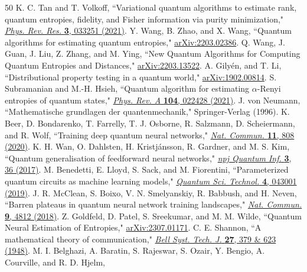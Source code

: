 \documentclass[aps,groupedaddress,superscriptaddress,amssymb,amsmath,amsbsy,amsfonts,twocolumn,pra]{revtex4}
\begin{document}
\begin{thebibliography}{50}
K. C. Tan and T. Volkoff,
``Variational quantum algorithms to estimate rank, quantum entropies, fidelity, and Fisher information via purity minimization,"
\href{http://dx.doi.org/10.1103/PhysRevResearch.3.033251}{
{\it Phys. Rev. Res.} \textbf{3}, 033251 (2021)}.
%
Y. Wang, B. Zhao, and X. Wang,
``Quantum algorithms for estimating quantum entropies,"
\href{https://doi.org/10.48550/arXiv.2203.02386}{
arXiv:2203.02386}.
%
Q. Wang, J. Guan, J. Liu, Z. Zhang, and M. Ying,
``New Quantum Algorithms for Computing Quantum Entropies and Distances,"
\href{https://doi.org/10.48550/arXiv.2203.13522}{
arXiv:2203.13522}.
%
A. Gily\'{e}n, and T. Li,
``Distributional property testing in a quantum world,"
\href{https://doi.org/10.48550/arXiv.1902.00814}{
arXiv:1902.00814}.
%
S. Subramanian and M.-H. Hsieh,
``Quantum algorithm for estimating $\alpha$-Renyi entropies of quantum states,"
\href{http://dx.doi.org/10.1103/PhysRevA.104.022428}{
{\it Phys. Rev. A} \textbf{104}, 022428 (2021)}. 
%
J. von Neumann,
``Mathematische grundlagen der quantenmechanik,"
Springer-Verlag (1996).
%
K. Beer, D. Bondarenko, T. Farrelly, T. J. Osborne, R. Salzmann, D. Scheiermann, and R. Wolf,
``Training deep quantum neural networks," 
\href{http://dx.doi.org/10.1038/s41467-020-14454-2}{
{\it Nat. Commun.} \textbf{11}, 808 (2020)}.
%
K. H. Wan, O. Dahlsten, H. Kristj\'{a}nsson, R. Gardner, and M. S. Kim,
``Quantum generalisation of feedforward neural networks," 
\href{http://dx.doi.org/10.1038/s41534-017-0032-4}{
{\it npj Quantum Inf.} \textbf{3}, 36 (2017)}.
%
M. Benedetti, E. Lloyd, S. Sack, and M. Fiorentini,
``Parameterized quantum circuits as machine learning models," 
\href{http://dx.doi.org/10.1088/2058-9565/ab4eb5}{
{\it Quantum Sci. Technol.} \textbf{4}, 043001 (2019)}.
%
J. R. McClean, S. Boixo, V. N. Smelyanskiy, R. Babbush, and H. Neven,
``Barren plateaus in quantum neural network training landscapes," 
\href{http://dx.doi.org/10.1038/s41467-018-07090-4}{
{\it Nat. Commun.} \textbf{9}, 4812 (2018)}.
%
%
Z. Goldfeld, D. Patel, S. Sreekumar, and M. M. Wilde,
``Quantum Neural Estimation of Entropies,"
\href{https://doi.org/10.48550/arXiv.2307.01171}{
arXiv:2307.01171}.
%
C. E. Shannon,
``A mathematical theory of communication,"
\href{http://dx.doi.org/10.1002/j.1538-7305.1948.tb01338.x}{
{\it Bell Syst. Tech. J.} \textbf{27}, 379 \& 623 (1948)}.
%
M. I. Belghazi, A. Baratin, S. Rajeswar, S. Ozair, Y. Bengio, A. Courville, and R. D. Hjelm,

\end{thebibliography}
\end{document}
